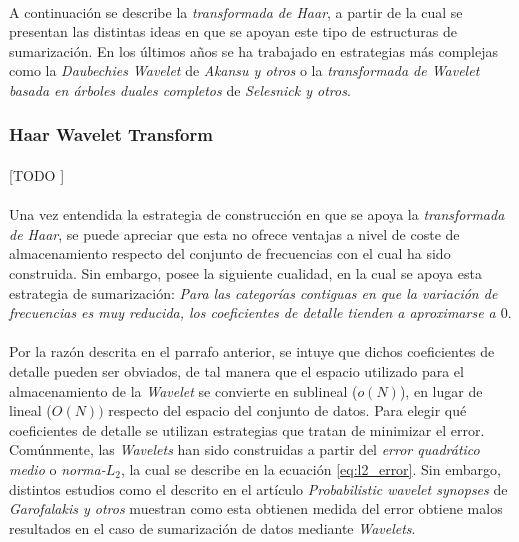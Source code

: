 \documentclass{subfiles}
\begin{document}
        \paragraph{}
        A continuación se describe la \emph{transformada de Haar}, a partir de la cual se presentan las distintas ideas en que se apoyan este tipo de estructuras de sumarización. En los últimos años se ha trabajado en estrategias más complejas como la \emph{Daubechies Wavelet} \cite{akansu2001multiresolution} de \emph{Akansu y otros} o la \emph{transformada de Wavelet basada en árboles duales completos} \cite{selesnick2005dual} de \emph{Selesnick y otros}.

        \subsubsection{Haar Wavelet Transform}

          \paragraph{}
          [TODO ]

        \paragraph{}
        Una vez entendida la estrategia de construcción en que se apoya la \emph{transformada de Haar}, se puede apreciar que esta no ofrece ventajas a nivel de coste de almacenamiento respecto del conjunto de frecuencias con el cual ha sido construida. Sin embargo, posee la siguiente cualidad, en la cual se apoya esta estrategia de sumarización: \emph{Para las categorías contiguas en que la variación de frecuencias es muy reducida, los coeficientes de detalle tienden a aproximarse a $0$}.

        \paragraph{}
        Por la razón descrita en el parrafo anterior, se intuye que dichos coeficientes de detalle pueden ser obviados, de tal manera que el espacio utilizado para el almacenamiento de la \emph{Wavelet} se convierte en sublineal ($o(N)$), en lugar de lineal ($O(N))$ respecto del espacio del conjunto de datos. Para elegir qué coeficientes de detalle se utilizan estrategias que tratan de minimizar el error. Comúnmente, las \emph{Wavelets} han sido construidas a partir del \emph{error quadrático medio} o \emph{norma-$L_2$}, la cual se describe en la ecuación \eqref{eq:l2_error}. Sin embargo, distintos estudios como el descrito en el artículo \emph{Probabilistic wavelet synopses} \cite{garofalakis2004probabilistic} de \emph{Garofalakis y otros} muestran como esta obtienen medida del error obtiene malos resultados en el caso de sumarización de datos mediante \emph{Wavelets}.
\end{document}
